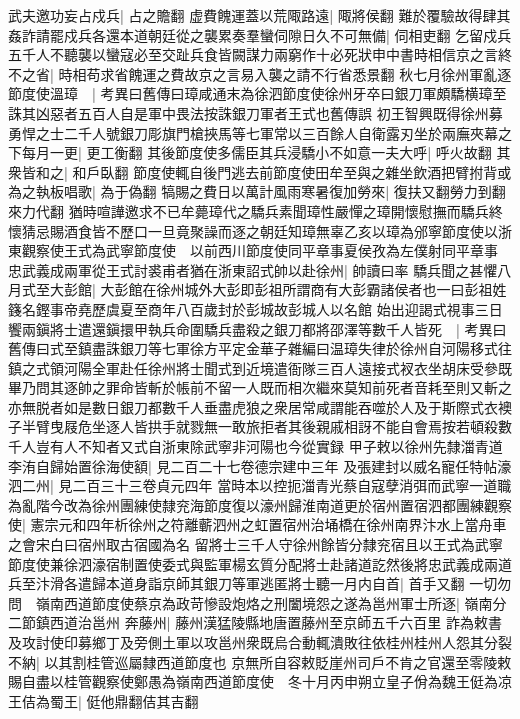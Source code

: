武夫邀功妄占戍兵|{
	占之贍翻}
虚費餽運蓋以荒陬路遠|{
	陬將侯翻}
難於覆驗故得肆其姦詐請罷戍兵各還本道朝廷從之襲累奏羣蠻伺隙日久不可無備|{
	伺相吏翻}
乞留戍兵五千人不聽襲以蠻寇必至交趾兵食皆闕謀力兩窮作十必死狀申中書時相信京之言終不之省|{
	時相苟求省餽運之費故京之言易入襲之請不行省悉景翻}
秋七月徐州軍亂逐節度使溫璋　|{
	考異曰舊傳曰璋咸通末為徐泗節度使徐州牙卒曰銀刀軍頗驕横璋至誅其凶惡者五百人自是軍中畏法按誅銀刀軍者王式也舊傳誤}
初王智興既得徐州募勇悍之士二千人號銀刀彫旗門槍挾馬等七軍常以三百餘人自衛露刃坐於兩廡夾幕之下每月一更|{
	更工衡翻}
其後節度使多儒臣其兵浸驕小不如意一夫大呼|{
	呼火故翻}
其衆皆和之|{
	和戶臥翻}
節度使輒自後門逃去前節度使田牟至與之雜坐飲酒把臂拊背或為之執板唱歌|{
	為于偽翻}
犒賜之費日以萬計風雨寒暑復加勞來|{
	復扶又翻勞力到翻來力代翻}
猶時喧譁邀求不已牟薨璋代之驕兵素聞璋性嚴憚之璋開懷慰撫而驕兵終懷猜忌賜酒食皆不歷口一旦竟聚譟而逐之朝廷知璋無辜乙亥以璋為邠寧節度使以浙東觀察使王式為武寧節度使　以前西川節度使同平章事夏侯孜為左僕射同平章事　忠武義成兩軍從王式討裘甫者猶在浙東詔式帥以赴徐州|{
	帥讀曰率}
驕兵聞之甚懼八月式至大彭館|{
	大彭館在徐州城外大彭即彭祖所謂商有大彭霸諸侯者也一曰彭祖姓籛名鏗事帝堯歷虞夏至商年八百歲封於彭城故彭城人以名館}
始出迎謁式視事三日饗兩鎭將士遣還鎭擐甲執兵命圍驕兵盡殺之銀刀都將邵澤等數千人皆死　|{
	考異曰舊傳曰式至鎮盡誅銀刀等七軍徐方平定金華子雜編曰温璋失律於徐州自河陽移式往鎮之式領河陽全軍赴任徐州將士聞式到近境遣衙隊三百人遠接式衩衣坐胡床受參既畢乃問其逐帥之罪命皆斬於帳前不留一人既而相次繼來莫知前死者音耗至則又斬之亦無脱者如是數日銀刀都數千人垂盡虎狼之衆居常咸謂能吞噬於人及于斯際式衣襖子半臂曳屐危坐逐人皆拱手就戮無一敢旅拒者其後親戚相訝不能自會焉按若頓殺數千人豈有人不知者又式自浙東除武寧非河陽也今從實録}
甲子敕以徐州先隸湽青道李洧自歸始置徐海使額|{
	見二百二十七卷德宗建中三年}
及張建封以威名寵任特帖濠泗二州|{
	見二百三十三卷貞元四年}
當時本以控扼湽青光蔡自寇孽消弭而武寧一道職為亂階今改為徐州團練使隸兖海節度復以濠州歸淮南道更於宿州置宿泗都團練觀察使|{
	憲宗元和四年析徐州之符離蘄泗州之虹置宿州治埇橋在徐州南界汴水上當舟車之會宋白曰宿州取古宿國為名}
留將士三千人守徐州餘皆分隸兖宿且以王式為武寧節度使兼徐泗濠宿制置使委式與監軍楊玄質分配將士赴諸道訖然後將忠武義成兩道兵至汴滑各遣歸本道身詣京師其銀刀等軍逃匿將士聽一月内自首|{
	首手又翻}
一切勿問　嶺南西道節度使蔡京為政苛慘設炮烙之刑闔境怨之遂為邕州軍士所逐|{
	嶺南分二節鎮西道治邕州}
奔藤州|{
	藤州漢猛陵縣地唐置藤州至京師五千六百里}
詐為敕書及攻討使印募鄉丁及旁側土軍以攻邕州衆既烏合動輒潰敗往依桂州桂州人怨其分裂不納|{
	以其割桂管巡屬隸西道節度也}
京無所自容敕貶崖州司戶不肯之官還至零陵敕賜自盡以桂管觀察使鄭愚為嶺南西道節度使　冬十月丙申朔立皇子佾為魏王侹為凉王佶為蜀王|{
	侹他鼎翻佶其吉翻}
